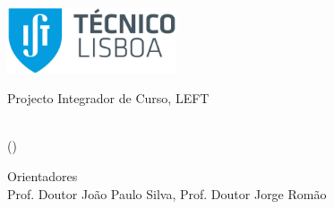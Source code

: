 \begin{center}
\begin{minipage}[c][5cm][t]{\textwidth}
    \includegraphics[width=5cm]{Pictures/IST_LOGO.png}
    \end{minipage}
    \begin{minipage}[t][10cm][c]{\textwidth}
    \centering
    {\FontLb\Huge \title{}}
\end{minipage}


\begin{minipage}[c][2cm][c]{\textwidth}
\centering
{\FontMb Projecto Integrador de Curso, LEFT} %
\end{minipage}
\begin{minipage}[c][2cm][c]{\textwidth}
\centering
{\FontLn\textbf{\name{}} \\ \vspace{0.1cm} (\istid{})}
\end{minipage}
\begin{minipage}[c][3cm][c]{\textwidth}
    \centering
    {\FontMb Orientadores} \\ \vspace{0.5cm}
    {\FontMb Prof. Doutor João Paulo Silva, Prof. Doutor Jorge Romão}
\end{minipage}
\begin{minipage}[c][2cm][c]{\textwidth}
    \centering
    {\FontMb \date{}}
\end{minipage}

\thispagestyle{empty}

\clearpage

\end{center}





